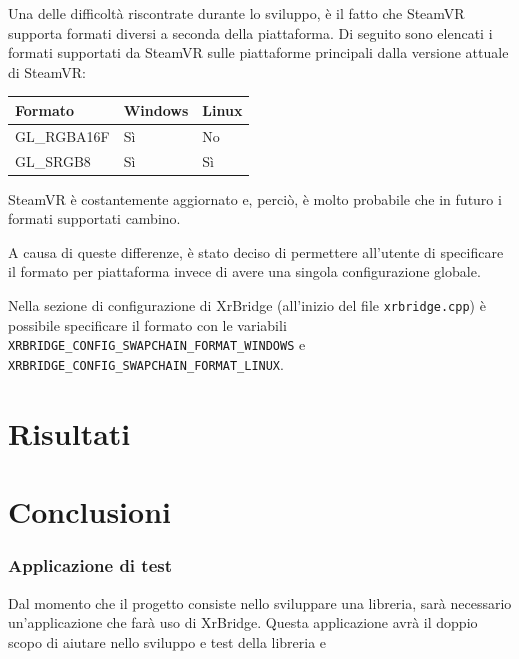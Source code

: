 \documentclass[twoside]{supsistudent}
\begin{document}
Una delle difficoltà riscontrate durante lo sviluppo, è il fatto che SteamVR supporta formati diversi a seconda della piattaforma. Di seguito sono elencati i formati supportati da SteamVR sulle piattaforme principali dalla versione attuale di SteamVR: %

\begin{center}
  \begin{tabular}{ l l l }
    Formato     & Windows & Linux \\
    \hline
    GL\_RGBA16F & Sì      & No    \\
    GL\_SRGB8   & Sì      & Sì    \\
  \end{tabular}
\end{center}

SteamVR è costantemente aggiornato e, perciò, è molto probabile che in futuro i formati supportati cambino.

A causa di queste differenze, è stato deciso di permettere all'utente di specificare il formato per piattaforma invece di avere una singola configurazione globale.

Nella sezione di configurazione di XrBridge (all'inizio del file \texttt{xrbridge.cpp}) è possibile specificare il formato con le variabili \texttt{XRBRIDGE\_CONFIG\_SWAPCHAIN\_FORMAT\_WINDOWS} e \texttt{XRBRIDGE\_CONFIG\_SWAPCHAIN\_FORMAT\_LINUX}.

\chapter{Risultati}


\chapter{Conclusioni}

\subsection{Applicazione di test}

Dal momento che il progetto consiste nello sviluppare una libreria, sarà necessario un'applicazione che farà uso di XrBridge. Questa applicazione avrà il doppio scopo di aiutare nello sviluppo e test della libreria e
\end{document}
